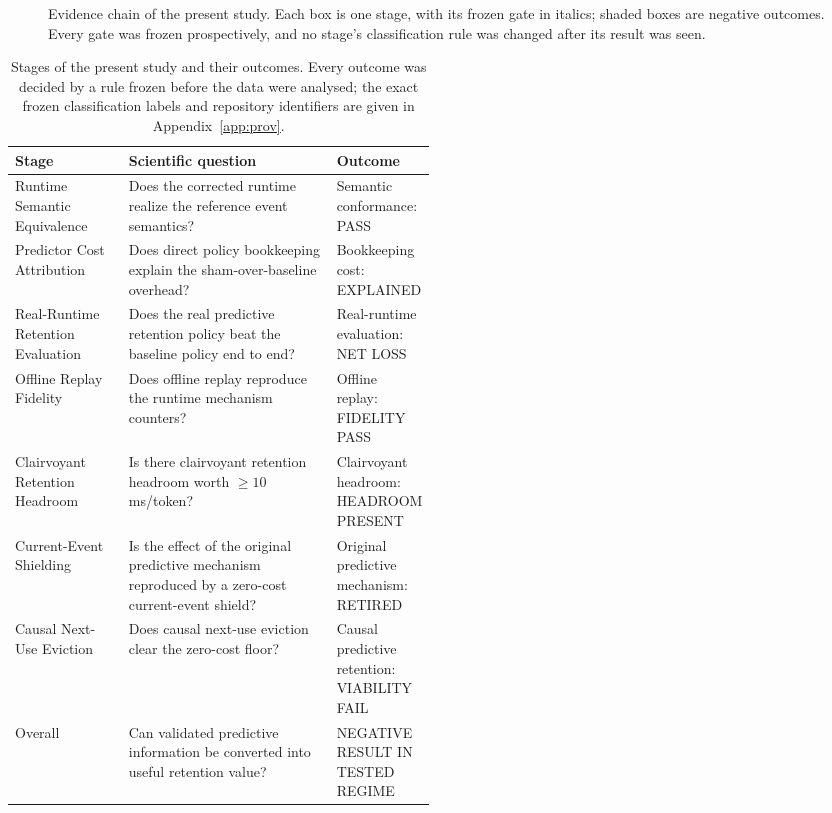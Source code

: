 \documentclass[11pt]{article}
\theoremstyle{plain}
\theoremstyle{definition}
\begin{document}
\begin{figure}[t]
\centering

\caption{Evidence chain of the present study. Each box is one stage, with its frozen gate in italics; shaded boxes are negative outcomes. Every gate was frozen prospectively, and no stage's classification rule was changed after its result was seen.}
\label{fig:chain}
\end{figure}

\begin{table}[t]
\centering
\caption{Stages of the present study and their outcomes. Every outcome was decided by a rule frozen before the data were analysed; the exact frozen classification labels and repository identifiers are given in Appendix~\ref{app:prov}.}
\label{tab:stages}
\small
\begin{tabularx}{\linewidth}{>{\raggedright\arraybackslash}p{0.27\linewidth}>{\raggedright\arraybackslash}X>{\raggedright\arraybackslash}p{0.22\linewidth}}
\toprule
Stage & Scientific question & Outcome \\
\midrule
Runtime Semantic Equivalence & Does the corrected runtime realize the reference event semantics? & Semantic conformance: PASS \\
Predictor Cost Attribution & Does direct policy bookkeeping explain the sham-over-baseline overhead? & Bookkeeping cost: EXPLAINED \\
Real-Runtime Retention Evaluation & Does the real predictive retention policy beat the baseline policy end to end? & Real-runtime evaluation: NET LOSS \\
Offline Replay Fidelity & Does offline replay reproduce the runtime mechanism counters? & Offline replay: FIDELITY PASS \\
Clairvoyant Retention Headroom & Is there clairvoyant retention headroom worth $\ge 10$ ms/token? & Clairvoyant headroom: HEADROOM PRESENT \\
Current-Event Shielding & Is the effect of the original predictive mechanism reproduced by a zero-cost current-event shield? & Original predictive mechanism: RETIRED \\
Causal Next-Use Eviction & Does causal next-use eviction clear the zero-cost floor? & Causal predictive retention: VIABILITY FAIL \\
\midrule
Overall & Can validated predictive information be converted into useful retention value? & NEGATIVE RESULT IN TESTED REGIME \\
\bottomrule
\end{tabularx}
\end{table}
\end{document}
